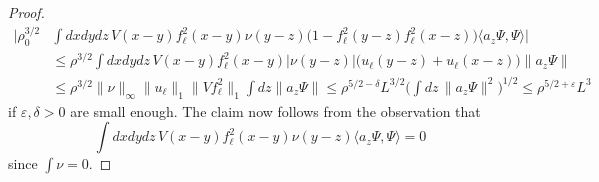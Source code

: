 \documentclass[a4paper,11pt]{article}
\def\eps{\varepsilon}
\numberwithin{equation}{section}
\begin{document}
\begin{proof}
\[ \begin{split} 
\Big|  \rho_0^{3/2} &\int dx dy dz \, V(x-y) f_\ell^2 (x-y) \nu (y-z) \big( 1 - f_\ell^2 (y-z) f_\ell^2 (x-z) \big) \langle a_z \Psi ,  \Psi \rangle \Big| \\ &\leq  \rho^{3/2} \int dx dy dz \, V(x-y)f_\ell^2(x-y)  |\nu (y-z)| \big( u_\ell (y-z) + u_\ell (x-z) \big) \| a_z \Psi \|  \\ &\leq \rho^{3/2} \| \nu \|_\infty \| u_\ell \|_1 \|Vf_\ell^2\|_1\int dz \| a_z \Psi \| \leq \rho^{5/2-\delta} L^{3/2} \Big( \int dz \, \|a_z \Psi \|^2 \Big)^{1/2} \leq \rho^{5/2+\eps} L^3 \end{split} \]
if $\eps, \delta > 0$ are small enough. The claim now follows from the observation that 
\[ \int dx dy dz \, V(x-y) f_\ell^2 (x-y) \nu (y-z) \langle a_z \Psi ,  \Psi \rangle = 0 \]
since $\int \nu = 0$. 
\end{proof}
\end{document}
